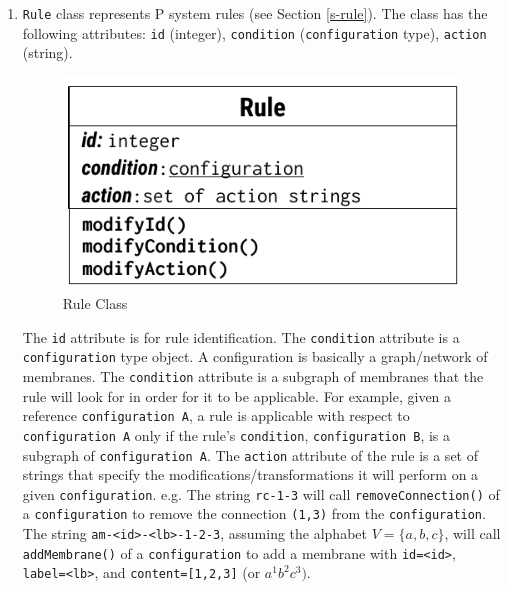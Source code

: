 \documentclass{article}
\begin{document}
\begin{enumerate}

\item \texttt{Rule} class represents P system rules (see Section \ref{s-rule}). The class has the 
following attributes: \texttt{id} (integer), \texttt{condition} (\texttt{configuration} type),
\texttt{action} (string).

\begin{figure}[H]
\begin{center}
    \includegraphics[scale=0.8]{figures/zzz-rule.pdf}
    \caption{Rule Class}
    \label{fig:rule}
\end{center}
\end{figure}

The \texttt{id} attribute is for rule identification. The \texttt{condition} attribute is a 
\texttt{configuration} type object. A configuration is basically a graph/network of
membranes. The \texttt{condition} attribute is a subgraph of membranes that the rule will look for
in order for it to be applicable. For example, given a reference \texttt{configuration A}, a rule is
applicable with respect to \texttt{configuration A} only if the rule's \texttt{condition}, 
\texttt{configuration B}, is a subgraph of \texttt{configuration A}. The \texttt{action} attribute
of the rule is a set of strings that specify the modifications/transformations it will perform on
a given \texttt{configuration}. e.g. The string \texttt{rc-1-3} will call
\texttt{removeConnection()} of a \texttt{configuration} to remove the connection \texttt{(1,3)}
from the \texttt{configuration}. The string \texttt{am-<id>-<lb>-1-2-3}, assuming the alphabet 
$V=\{a,b,c\}$, will call \texttt{addMembrane()} of a \texttt{configuration} to add a membrane
with \texttt{id=<id>}, \texttt{label=<lb>}, and \texttt{content=[1,2,3]} (or $a^1b^2c^3)$.


\end{enumerate}
\end{document}

